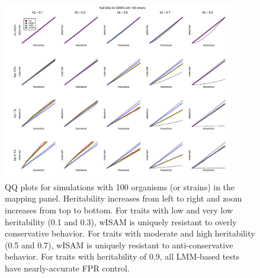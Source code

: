 \begin{figure}
  \centering
  \includegraphics[width = 0.9\textwidth]{images/2018-05-19alt_heterosked_sims_nstrain=100_nsnps=100_nsims=10000.pdf}
  \caption[
    QQ plots for simulations with 100 organisms in the mapping panel.
  ]{
    QQ plots for simulations with 100 organisms (or strains) in the mapping panel.
    Heritability increases from left to right and zoom increases from top to bottom.
    For traits with low and very low heritability (0.1 and 0.3), wISAM is uniquely resistant to overly conservative behavior.
    For traits with moderate and high heritability (0.5 and 0.7), wISAM is uniquely resistant to anti-conservative behavior.
    For traits with heritability of 0.9, all LMM-based tests have nearly-accurate FPR control.
  }
  \label{fig:qqmegaplot2}
\end{figure}

